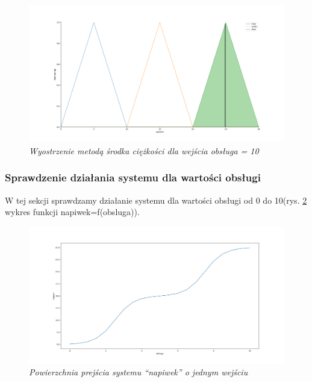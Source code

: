 \documentclass[a4paper, 10pt]{article}
\begin{document}
\begin{figure}[H]
	\centering
	\includegraphics[scale=0.25]{Figure_4.png}
	\caption{\textit{Wyostrzenie metodą środka ciężkości dla wejścia obsługa = 10}}
	\label{fig:obsluga10}

\end{figure}

\subsubsection{Sprawdzenie działania systemu dla wartości obsługi}\label{p8}

W tej sekcji sprawdzamy działanie systemu dla wartości obsługi od 0 do 10(rys. \ref{fig:napiwek_obsluga} wykres funkcji napiwek=f(obsluga)).



\begin{figure}[H]
	\centering
	\includegraphics[scale=0.25]{Figure_5.png}
	\caption{\textit{Powierzchnia prejścia systemu ``napiwek'' o jednym wejściu}}
	\label{fig:napiwek_obsluga}
\end{figure}
\end{document}
